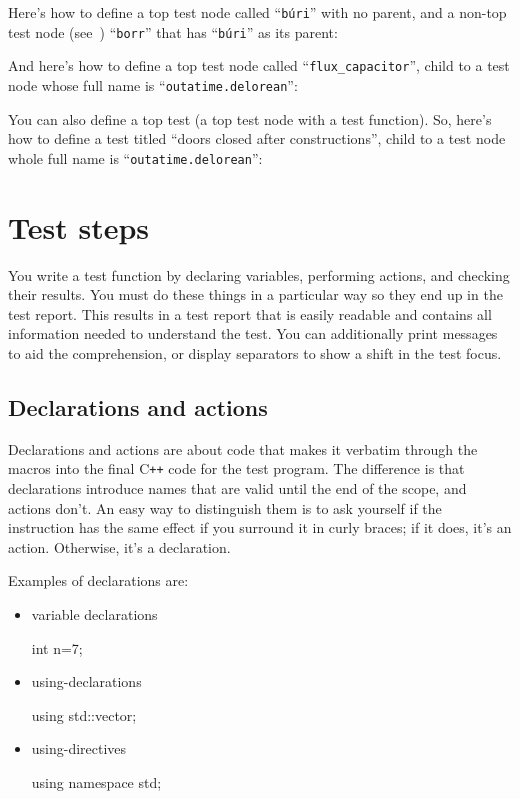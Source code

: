 \documentclass[twoside, a4paper, article]{memoir}
\newcommand\typesetexampleandreport[1]{%
  \typesetexamplesource{#1}
  \typesetexamplereport{#1}
}
\providecommand\typesetexamplereport[1]{%
}
\providecommand\typesetexamplesource[1]{%
}
\newcommand*\Cpp{C\texttt{++}}
\begin{document}
Here's how to define a top test node called ``\texttt{búri}'' with no parent,
and a non-top test node (see~) ``\texttt{borr}''
that has ``\texttt{búri}'' as its parent:

\typesetexampleandreport{top-test-node-no-parent-and-child}

And here's how to define a top test node called ``\texttt{flux\_capacitor}'',
child to a test node whose full name is ``\texttt{outatime.delorean}'':

\typesetexampleandreport{top-test-node}

You can also define a top test (a top test node with a test function).  So,
here's how to define a test titled ``doors closed after constructions'', child
to a test node whole full name is ``\texttt{outatime.delorean}'':

\typesetexampleandreport{top-test}


\chapter{Test steps}
\label{cha:test-steps}

You write a test function by declaring variables, performing actions, and
checking their results.  You must do these things in a particular way so they
end up in the test report.  This results in a test report that is easily
readable and contains all information needed to understand the test.  You can
additionally print messages to aid the comprehension, or display separators to
show a shift in the test focus.

\section{Declarations and actions}
\label{sec:declarations-actions}

Declarations and actions are about code that makes it verbatim through the
macros into the final \Cpp{} code for the test program.  The difference is that
declarations introduce names that are valid until the end of the scope, and
actions don't.  An easy way to distinguish them is to ask yourself if the
instruction has the same effect if you surround it in curly braces; if it does,
it's an action. Otherwise, it's a declaration.

Examples of declarations are:
\begin{itemize}
\item variable declarations
\begin{cpplisting}
int n=7;
\end{cpplisting}

\item using-declarations
\begin{cpplisting}
using std::vector;
\end{cpplisting}

\item using-directives
\begin{cpplisting}
using namespace std;
\end{cpplisting}
\end{itemize}
\end{document}
